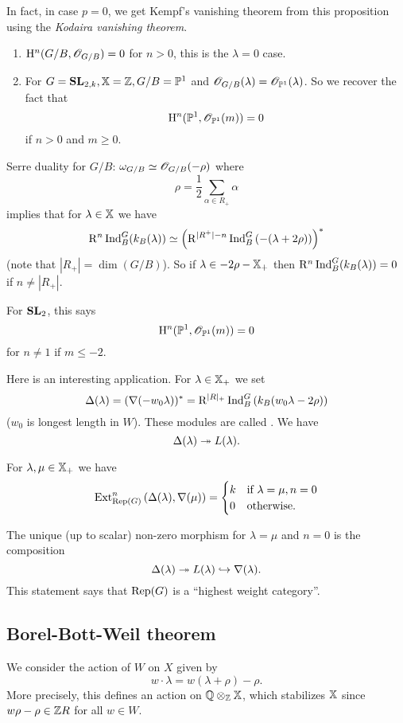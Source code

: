 In fact, in case $p=0$, we get Kempf's vanishing theorem from this proposition using the \emph{Kodaira vanishing theorem}.
\begin{example}\leavevmode
	\begin{enumerate}[(1)]
		\item $\mathrm{H}^{n}(G /B,\mathscr{O}_{G /B})=0$ for $n>0$, this is the $\lambda=0$ case.
		\item For $G=\mathbf{SL}_{2,k}, \mathbb{X}=\mathbb Z, G /B=\mathbb{P}^{1}$ and $\mathscr{O}_{G /B}(\lambda)=\mathscr{O}_{\mathbb{P}^{1}}(\lambda)$. So we recover the fact that
			\[
			\mathrm{H}^{n}(\mathbb{P}^{1},\mathscr{O}_{\mathbb{P}^{1}}(m)) = 0
			\] 
			if $n>0$ and $m\ge 0$.
	\end{enumerate}
\end{example}
\begin{remark}
	Serre duality for $G /B$:  $\omega_{G /B}\simeq \mathscr{O}_{G /B}(-\rho)$ where
	\[
	\rho = \frac{1}{2}\sum_{\alpha\in R_+}\alpha
	\] 
	implies that for $\lambda\in \mathbb{X}$ we have
	\[
	\mathrm{R}^{n}\operatorname{Ind}_{B}^{G}(k_B(\lambda)) \simeq \left( \mathrm{R}^{|R^{+}|-n}\operatorname{Ind}_B^{G}\left( -(\lambda+2\rho) \right)  \right) ^{*}
	\] 
	(note that $|R_+| = \dim(G /B)$). So if $\lambda\in -2\rho-\mathbb{X}_+$ then $\mathrm{R}^{n}\operatorname{Ind}_B^{G}(k_B(\lambda))=0$ if $n\neq |R_+|$.

	For $\mathbf{SL}_2$, this says
	\[
	\mathrm{H}^{n}(\mathbb{P}^{1},\mathscr{O}_{\mathbb{P}^{1}}(m)) = 0
	\] 
	for $n\neq 1$ if $m\le -2$.
\end{remark}

Here is an interesting application. For $\lambda\in \mathbb{X}_+$ we set
\[
\Delta(\lambda) = \left( \nabla (-w_0\lambda \right) )^{*} = \mathrm{R}^{|R|_+}\operatorname{Ind}_B^{G}\left( k_B(w_0\lambda-2\rho) \right) 
\] 
($w_0$ is longest length in $W$). These modules are called . We have
\[
\Delta(\lambda) \twoheadrightarrow L(\lambda).
\] 

\begin{proposition}
	For $\lambda,\mu\in \mathbb{X}_+$ we have
	\[
	\operatorname{Ext}_{\operatorname{Rep}(G)}^{n}\left( \Delta(\lambda),\nabla(\mu) \right) = \begin{cases}
		k & \text{if }\lambda=\mu, n=0 \\
		0 & \text{otherwise}.
	\end{cases}
	\] 
\end{proposition}
The unique (up to scalar) non-zero morphism for $\lambda=\mu$ and $n=0$ is the composition
\[
\Delta(\lambda) \twoheadrightarrow L(\lambda) \hookrightarrow \nabla(\lambda).
\] 
This statement says that $\operatorname{Rep}(G)$ is a ``highest weight category''.

\subsection{Borel-Bott-Weil theorem}
We consider the action of $W$ on $X$ given by 
\[
w\cdot \lambda = w(\lambda+\rho) - \rho.
\] 
More precisely, this defines an action on $\mathbb Q\otimes_\mathbb Z\mathbb{X}$, which stabilizes $\mathbb{X}$ since $w\rho-\rho\in \mathbb Z R$ for all $w\in W$.

